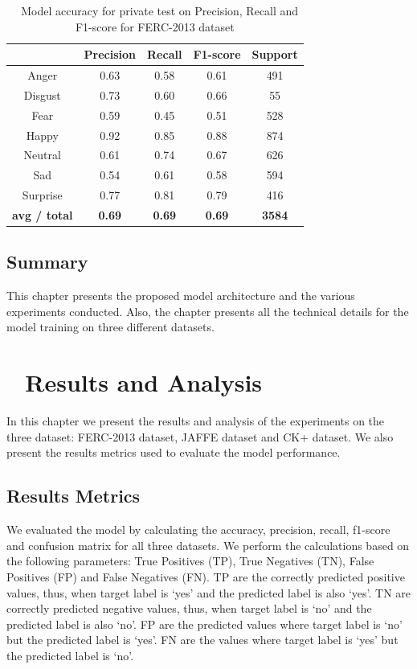 \documentclass[master]{thesis-uestc}
\begin{document}
\begin{table}[ht]
\renewcommand{\arraystretch}{1.3}
\caption{\,\,\,\,\,Model accuracy for private test on Precision, Recall and F1-score for FERC-2013 dataset}
\label{table_fer2013_scores_private}
\begin{center}
\begin{tabular}{|c|c|c|c|c|}

\hline
 & Precision & Recall & F1-score & Support\\ \hline

Anger & 0.63 & 0.58 & 0.61 & 491\\ \hline
Disgust & 0.73 & 0.60 & 0.66 & 55\\ \hline
Fear & 0.59 & 0.45 & 0.51 & 528\\ \hline
Happy & 0.92 & 0.85 & 0.88 & 874\\ \hline
Neutral & 0.61 & 0.74 & 0.67 & 626\\ \hline
Sad & 0.54 & 0.61 & 0.58 & 594\\ \hline
Surprise & 0.77 & 0.81 & 0.79 & 416\\ \hline

\textbf{avg / total} & \textbf{0.69} & \textbf{0.69} & \textbf{0.69} & \textbf{3584}\\ \hline
\end{tabular}
\end{center}
\end{table}

\section{Summary}
This chapter presents the proposed model architecture and the various experiments conducted. Also, the chapter presents all the technical details for the model training on three different datasets.

\chapter{\,\,\,\,\,\textbf{Results and Analysis}}\label{chp4}
In this chapter we present the results and analysis of the experiments on the three dataset: FERC-2013 dataset, JAFFE dataset and CK+ dataset. We also present the results metrics used to evaluate the model performance.
\section{Results Metrics}
We evaluated the model by calculating the accuracy, precision, recall, f1-score and confusion matrix\cite{FAWCETT2006861} for all three datasets. We perform the calculations based on the following parameters: True Positives (TP), True Negatives (TN), False Positives (FP) and False Negatives (FN). TP are the correctly predicted positive values, thus, when target label is `yes' and the predicted label is also `yes'. TN are correctly predicted negative values, thus, when target label is `no' and the predicted label is also `no'. FP are the predicted values where target label is `no' but the predicted label is `yes'. FN are the values where target label is `yes' but the predicted label is `no'.
\end{document}
